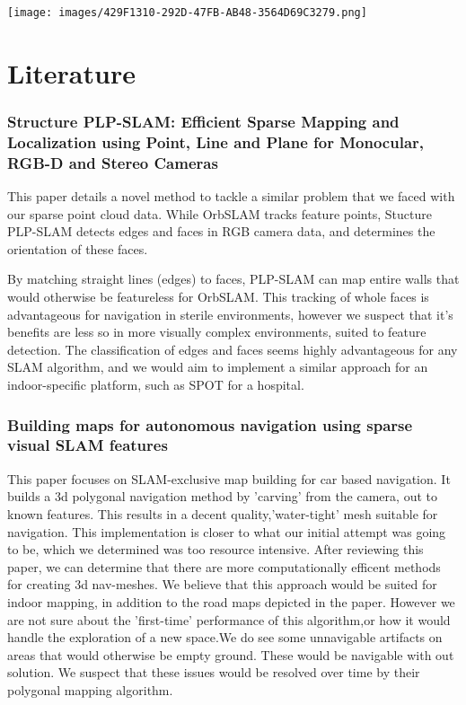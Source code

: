 \documentclass[10pt,english]{article}
\begin{document}
\clearpage

\vspace*{\fill}
\begin{center}
\texttt{[image: images/429F1310-292D-47FB-AB48-3564D69C3279.png]}
\linebreak
\linebreak
{}
\end{center}
\vfill
\thispagestyle{empty}
\clearpage

\section*{Literature}

\subsubsection*{Structure PLP-SLAM: Efficient Sparse Mapping and Localization using Point, Line and Plane for Monocular, RGB-D and Stereo Cameras}

This paper details a novel method to tackle a similar problem that we faced with our sparse point cloud data. While OrbSLAM tracks feature points, Stucture PLP-SLAM detects edges and faces in RGB camera data, and determines the orientation of these faces.

By matching straight lines (edges) to faces, PLP-SLAM can map entire walls that would otherwise be featureless for OrbSLAM. This tracking of whole faces is advantageous for navigation in sterile environments, however we suspect that it's benefits are less so in more visually complex environments, suited to feature detection. The classification of edges and faces seems highly advantageous for any SLAM algorithm, and we would aim to implement a similar approach for an indoor-specific platform, such as SPOT for a hospital.

\subsubsection*{Building maps for autonomous navigation using sparse visual SLAM features}

This paper focuses on SLAM-exclusive map building for car based navigation. It builds a 3d polygonal navigation method by 'carving' from the camera, out to known features. This results in a decent quality,'water-tight' mesh suitable for navigation. This implementation is closer to what our initial attempt was going to be, which we determined was too resource intensive. After reviewing this paper, we can determine that there are more computationally efficent methods for creating 3d nav-meshes. We believe that this approach would be suited for indoor mapping, in addition to the road maps depicted in the paper. However we are not sure about the 'first-time' performance of this algorithm,or how it would handle the exploration of a new space.We do see some unnavigable artifacts on areas that would otherwise be empty ground. These would be navigable with out solution. We suspect that these issues would be resolved over time by their polygonal mapping algorithm.
\end{document}
